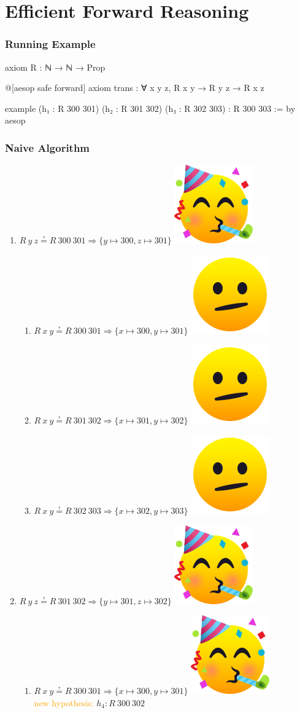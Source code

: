 \documentclass[xetex]{beamer}
\newlength{\emojiheight}
\newcommand{\good}{\includegraphics[height=\emojiheight]{images/1f973}}
\newcommand{\bad}{\includegraphics[height=\emojiheight]{images/1fae4}}
\newcommand{\orange}[1]{\textcolor{orange}{#1}}
\newenvironment{rapppic}{\begin{tikzpicture}[outer sep=auto, level distance=2em]}{\end{tikzpicture}}
\newenvironment{rapp}{%
  \begin{tcolorbox}
  \begin{center}
  \begin{rapppic}
}{
  \end{rapppic}
  \end{center}
  \end{tcolorbox}%
}
\begin{document}
\section{Efficient Forward Reasoning}


\begin{frame}[fragile]
  \frametitle{Running Example}

  \begin{leancode}
    axiom R : ℕ → ℕ → Prop

    @[aesop safe forward]
    axiom trans : ∀ x y z, R x y → R y z → R x z

    example
        (h₁ : R 300 301)
        (h₂ : R 301 302)
        (h₃ : R 302 303) :
        R 300 303 := by
      aesop
  \end{leancode}
\end{frame}

\begin{frame}
  \frametitle{Naive Algorithm}

  \begin{enumerate}[<+->]
    \item $R~y~z ≟ R~300~301 ⇒ \{y ↦ 300, z ↦ 301\}$ \good
          \begin{enumerate}[<+->]
            \item $R~x~y ≟ R~300~301 ⇒ \{x ↦ 300, y ↦ 301\}$ \bad
            \item $R~x~y ≟ R~301~302 ⇒ \{x ↦ 301, y ↦ 302\}$ \bad
            \item $R~x~y ≟ R~302~303 ⇒ \{x ↦ 302, y ↦ 303\}$ \bad
          \end{enumerate}
    \item $R~y~z ≟ R~301~302 ⇒ \{y ↦ 301, z ↦ 302\}$ \good
          \begin{enumerate}[<+->]
            \item $R~x~y ≟ R~300~301 ⇒ \{x ↦ 300, y ↦ 301\}$ \good \\
                  \orange{new hypothesis:} $h_{4} : R~300~302$
          \end{enumerate}
  \end{enumerate}
\end{frame}
\end{document}
